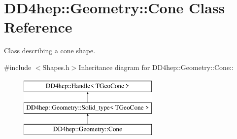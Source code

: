 \hypertarget{class_d_d4hep_1_1_geometry_1_1_cone}{
\section{DD4hep::Geometry::Cone Class Reference}
\label{class_d_d4hep_1_1_geometry_1_1_cone}
}


Class describing a cone shape.  


{\ttfamily \#include $<$Shapes.h$>$}Inheritance diagram for DD4hep::Geometry::Cone::\begin{figure}[H]
\begin{center}
\leavevmode
\includegraphics[height=3cm]{class_d_d4hep_1_1_geometry_1_1_cone}
\end{center}
\end{figure}
